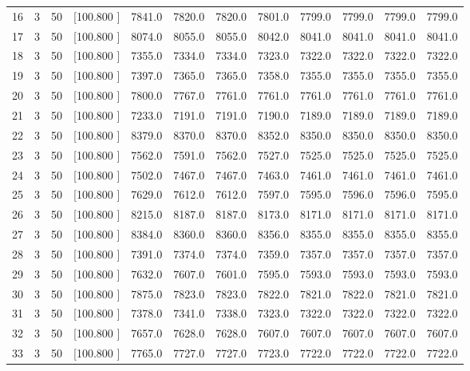 \documentclass[12pt,a4paper]{article}
\begin{document}
\begin{center}
{\begin{tabular}{r r r r r r r r r r r r}
  16&  3& 50&[100.800   ]&  7841.0&  7820.0&  7820.0&  7801.0&  7799.0&  7799.0&  7799.0&  7799.0\\[-0.02in]
  17&  3& 50&[100.800   ]&  8074.0&  8055.0&  8055.0&  8042.0&  8041.0&  8041.0&  8041.0&  8041.0\\[-0.02in]
  18&  3& 50&[100.800   ]&  7355.0&  7334.0&  7334.0&  7323.0&  7322.0&  7322.0&  7322.0&  7322.0\\[-0.02in]
  19&  3& 50&[100.800   ]&  7397.0&  7365.0&  7365.0&  7358.0&  7355.0&  7355.0&  7355.0&  7355.0\\[-0.02in]
  20&  3& 50&[100.800   ]&  7800.0&  7767.0&  7761.0&  7761.0&  7761.0&  7761.0&  7761.0&  7761.0\\[-0.02in]
  21&  3& 50&[100.800   ]&  7233.0&  7191.0&  7191.0&  7190.0&  7189.0&  7189.0&  7189.0&  7189.0\\[-0.02in]
  22&  3& 50&[100.800   ]&  8379.0&  8370.0&  8370.0&  8352.0&  8350.0&  8350.0&  8350.0&  8350.0\\[-0.02in]
  23&  3& 50&[100.800   ]&  7562.0&  7591.0&  7562.0&  7527.0&  7525.0&  7525.0&  7525.0&  7525.0\\[-0.02in]
  24&  3& 50&[100.800   ]&  7502.0&  7467.0&  7467.0&  7463.0&  7461.0&  7461.0&  7461.0&  7461.0\\[-0.02in]
  25&  3& 50&[100.800   ]&  7629.0&  7612.0&  7612.0&  7597.0&  7595.0&  7596.0&  7596.0&  7595.0\\[-0.02in]
  26&  3& 50&[100.800   ]&  8215.0&  8187.0&  8187.0&  8173.0&  8171.0&  8171.0&  8171.0&  8171.0\\[-0.02in]
  27&  3& 50&[100.800   ]&  8384.0&  8360.0&  8360.0&  8356.0&  8355.0&  8355.0&  8355.0&  8355.0\\[-0.02in]
  28&  3& 50&[100.800   ]&  7391.0&  7374.0&  7374.0&  7359.0&  7357.0&  7357.0&  7357.0&  7357.0\\[-0.02in]
  29&  3& 50&[100.800   ]&  7632.0&  7607.0&  7601.0&  7595.0&  7593.0&  7593.0&  7593.0&  7593.0\\[-0.02in]
  30&  3& 50&[100.800   ]&  7875.0&  7823.0&  7823.0&  7822.0&  7821.0&  7822.0&  7821.0&  7821.0\\[-0.02in]
  31&  3& 50&[100.800   ]&  7378.0&  7341.0&  7338.0&  7323.0&  7322.0&  7322.0&  7322.0&  7322.0\\[-0.02in]
  32&  3& 50&[100.800   ]&  7657.0&  7628.0&  7628.0&  7607.0&  7607.0&  7607.0&  7607.0&  7607.0\\[-0.02in]
  33&  3& 50&[100.800   ]&  7765.0&  7727.0&  7727.0&  7723.0&  7722.0&  7722.0&  7722.0&  7722.0\\[-0.02in]

\end{tabular}}
\end{center}
\end{document}
